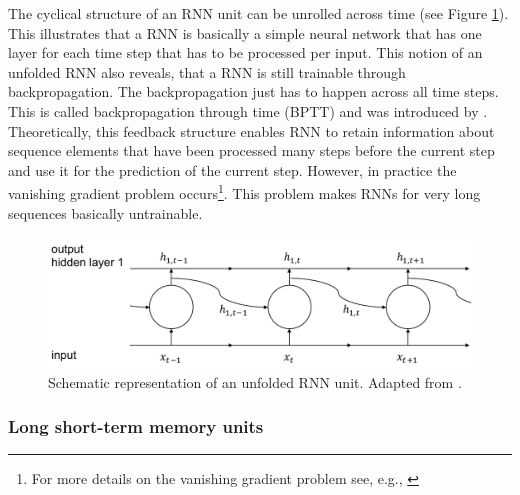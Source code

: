 The cyclical structure of an RNN unit can be unrolled across time (see Figure \ref{Fig:RNNunfolded}). This illustrates that a RNN is basically a simple neural network that has one layer for each time step that has to be processed per input. This notion of an unfolded RNN also reveals, that a RNN is still trainable through backpropagation. The backpropagation just has to happen across all time steps. This is called backpropagation through time (BPTT) and was introduced by \citet{Werbos:1990}. Theoretically, this feedback structure enables RNN to retain information about sequence elements that have been processed many steps before the current step and use it for the prediction of the current step. However, in practice the vanishing gradient problem occurs\footnote{For more details on the vanishing gradient problem see, e.g., \citet{Bengio:1994}}. This problem makes RNNs for very long sequences basically untrainable.
%
\begin{figure}[htbp]
    \centering
    \includegraphics[scale=0.6]{thesis/figures/RNNunfolded.pdf}
    \caption[Schematic representation of an unfolded RNN unit]{Schematic representation of an unfolded RNN unit. Adapted from \citet{chollet:2018}.}
    \label{Fig:RNNunfolded}
\end{figure}



\subsubsection{Long short-term memory units}

